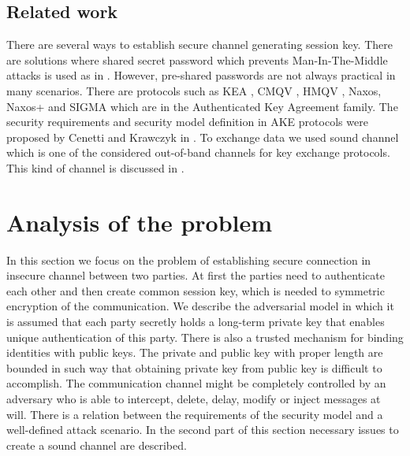 \documentclass[11pt,titlepage]{article}
\theoremstyle{plain}
\begin{document}





\subsection{Related work}
There are several ways to establish secure channel generating session key.
There are solutions where shared secret password which prevents Man-In-The-Middle attacks is used as in \cite{EKE, EKE2}. However, pre-shared passwords are not always practical in many scenarios. There are protocols such as KEA \cite{KEA}, CMQV \cite{CMQV}, HMQV \cite{HMQV}, Naxos, Naxos+ \cite{NAXOS} and SIGMA \cite{sign_mac} which are in the Authenticated Key Agreement family. The security requirements and security model definition in AKE protocols were proposed by Cenetti and Krawczyk in \cite{security_canetti_krawczyk, key_exchange}. To exchange data we used sound channel which is one of the considered out-of-band channels for key exchange protocols. This kind of channel is discussed in \cite{chirp, sib, ad_hoc, veh, vibrat, audio_modem}.

\section{Analysis of the problem}

In this section we focus on the problem of establishing secure connection in insecure channel between two parties. At first the parties need to authenticate each other and then create common session key, which is needed to symmetric encryption of the communication. We describe the adversarial model in which it is assumed that each party secretly holds a long-term private key that enables unique authentication of this party. There is also a trusted mechanism for binding identities with public keys. The private and public key with proper length are bounded in such way that obtaining private key from public key is difficult to accomplish. The communication channel might be completely controlled by an adversary who is able to intercept, delete, delay, modify or inject messages at will. There is a relation between the requirements of the security model and a well-defined attack scenario. In the second part of this section necessary issues to create a sound channel are described.
\end{document}
